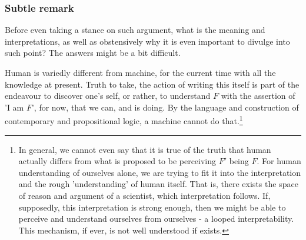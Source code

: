 \subsubsection{Subtle remark}
Before even taking a stance on such argument, what is the meaning and interpretations, as well as obstensively why it is even important to divulge into such point? The answers might be a bit difficult.

Human is variedly different from machine, for the current time with all the knowledge at present. Truth to take, the action of writing this itself is part of the endeavour to discover one's self, or rather, to understand $F$ with the assertion of 'I am $F$', for now, that we can, and is doing. By the language and construction of contemporary and propositional logic, a machine cannot do that.\footnote{In general, we cannot even say that it is true of the truth that human actually differs from what is proposed to be perceiving $F'$ being $F$. For human understanding of ourselves alone, we are trying to fit it into the interpretation and the rough 'understanding' of human itself. That is, there exists the space of reason and argument of a scientist, which interpretation follows. If, supposedly, this interpretation is strong enough, then we might be able to perceive and understand ourselves from ourselves - a looped interpretability. This mechanism, if ever, is not well understood if exists.}

